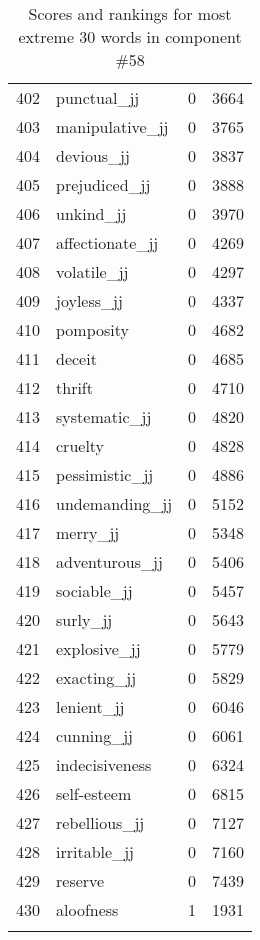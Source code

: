 \begin{longtable}[!htbp]{| rlr@{.}l |}
    402 & punctual\_jj & 0 & 3664 \\
    403 & manipulative\_jj & 0 & 3765 \\
    404 & devious\_jj & 0 & 3837 \\
    405 & prejudiced\_jj & 0 & 3888 \\
    406 & unkind\_jj & 0 & 3970 \\
    407 & affectionate\_jj & 0 & 4269 \\
    408 & volatile\_jj & 0 & 4297 \\
    409 & joyless\_jj & 0 & 4337 \\
    410 & pomposity & 0 & 4682 \\
    411 & deceit & 0 & 4685 \\
    412 & thrift & 0 & 4710 \\
    413 & systematic\_jj & 0 & 4820 \\
    414 & cruelty & 0 & 4828 \\
    415 & pessimistic\_jj & 0 & 4886 \\
    416 & undemanding\_jj & 0 & 5152 \\
    417 & merry\_jj & 0 & 5348 \\
    418 & adventurous\_jj & 0 & 5406 \\
    419 & sociable\_jj & 0 & 5457 \\
    420 & surly\_jj & 0 & 5643 \\
    421 & explosive\_jj & 0 & 5779 \\
    422 & exacting\_jj & 0 & 5829 \\
    423 & lenient\_jj & 0 & 6046 \\
    424 & cunning\_jj & 0 & 6061 \\
    425 & indecisiveness & 0 & 6324 \\
    426 & self-esteem & 0 & 6815 \\
    427 & rebellious\_jj & 0 & 7127 \\
    428 & irritable\_jj & 0 & 7160 \\
    429 & reserve & 0 & 7439 \\
    430 & aloofness & 1 & 1931 \\
    \hline
    \caption{Scores and rankings for most extreme 30 words in component \#58} \\
\end{longtable}
